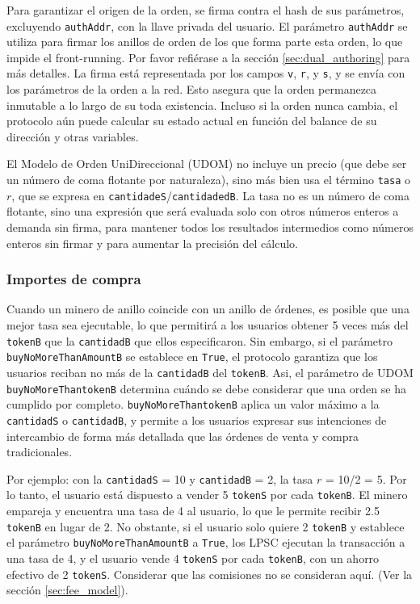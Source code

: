 \documentclass[UTF8,nofonts]{article}
\begin{document}
\begin{multicols}{2}
Para garantizar el origen de la orden, se firma contra el hash de sus par\'ametros, excluyendo \verb|authAddr|, con la llave privada del usuario. El par\'ametro \verb|authAddr| se utiliza para firmar los anillos de orden de los que forma parte esta orden, lo que impide el front-running. Por favor refi\'erase a la secci\'on \ref{sec:dual_authoring} para m\'as detalles. La firma est\'a representada por los campos \verb|v|, \verb|r|, y \verb|s|, y se env\'ia con los par\'ametros de la orden a la red. Esto asegura que la orden permanezca inmutable a lo largo de su toda existencia. Incluso si la orden nunca cambia, el protocolo a\'un puede calcular su estado actual en funci\'on del balance de su direcci\'on y otras variables. 

El Modelo de Orden UniDireccional (UDOM) no incluye un precio (que debe ser un n\'umero de coma flotante por naturaleza), sino m\'as bien usa el t\'ermino \verb|tasa| o $r$, que se expresa en \verb|cantidadeS|/\verb|cantidadedB|. La tasa no es un n\'umero de coma flotante, sino una expresi\'on que ser\'a evaluada solo con otros n\'umeros enteros a demanda sin firma, para mantener todos los resultados intermedios como n\'umeros enteros sin firmar y para aumentar la precisi\'on del c\'alculo.

\subsubsection{Importes de compra}

Cuando un minero de anillo coincide con un anillo de \'ordenes, es posible que una mejor tasa sea ejecutable, lo que permitir\'a a los usuarios obtener 5 veces m\'as del \verb|tokenB| que la \verb|cantidadB| que ellos especificaron. Sin embargo, si el par\'ametro \verb|buyNoMoreThanAmountB| se establece en \verb|True|, el protocolo garantiza que los usuarios reciban no m\'as de la \verb|cantidadB| del \verb|tokenB|. Asi, el par\'ametro de UDOM \verb|buyNoMoreThantokenB| determina cu\'ando se debe considerar que una orden se ha cumplido por completo. \verb|buyNoMoreThantokenB| aplica un valor m\'aximo a la \verb|cantidadS| o \verb|cantidadB|, y permite a los usuarios expresar sus intenciones de intercambio de forma m\'as detallada que las \'ordenes de venta y compra tradicionales.

Por ejemplo: con la \verb|cantidadS| = 10 y \verb|cantidadB| = 2, la tasa $r$ = 10/2 = 5. Por lo tanto, el usuario est\'a dispuesto a vender 5  \verb|tokenS| por cada \verb|tokenB|. El minero empareja y encuentra una tasa de 4 al usuario, lo que le permite recibir 2.5 \verb|tokenB| en lugar de 2. No obstante, si el usuario solo quiere 2 \verb|tokenB| y establece el par\'ametro \verb|buyNoMoreThanAmountB| a \verb|True|, los LPSC ejecutan la transacci\'on a una tasa de 4, y el usuario vende 4 \verb|tokenS| por cada \verb|tokenB|, con un ahorro efectivo de 2 \verb|tokenS|. Considerar que las comisiones no se consideran aqu\'i.  (Ver la secci\'on \ref{sec:fee_model}).


\end{multicols}
\end{document}
